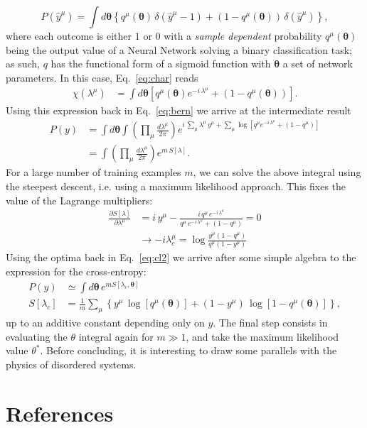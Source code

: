 \documentclass[5p]{elsarticle}
\begin{document}
%
\begin{equation} \label{eq:bern}
P(\hat{y}^{\mu} ) = \int d\boldsymbol{\theta} \left\{ q^{\mu}(\boldsymbol{\theta}) \, \delta(\hat{y}^{\mu}-1 ) + (1-q^{\mu}(\boldsymbol{\theta}) ) \, \delta(\hat{y}^{\mu}) \right\},
\end{equation}
%
where each outcome is either $1$ or $0$ with a {\it sample dependent} probability $q^{\mu}(\boldsymbol{\theta})$ being the output value of a Neural Network solving a binary classification task; as such, $q$ has the functional form of a sigmoid function with $\boldsymbol{\theta}$ a set of network parameters. In this case, Eq.~\eqref{eq:char} reads
\begin{align} \label{eq:char}
 \chi(\lambda^{\mu}) &=  \int  d\boldsymbol{\theta} \left[ q^{\mu}(\boldsymbol{\theta} ) e^{-i \, \lambda^{\mu} } +(1-q^{\mu}(\boldsymbol{\theta} )) \right].
 \end{align}
%
Using this expression back in Eq.~\eqref{eq:bern} we arrive at the intermediate result
%
 \begin{align} \label{eq:cl2}
 P(y) &= \int d\boldsymbol{\theta} \int  \left( \prod_{\mu}  \frac{d\lambda^{\mu}}{2\pi} \right) e^{i \, \sum_{\mu} \lambda^{\mu} \, y^{\mu} +\sum_{\mu} \log \left[ q^{\mu} e^{-i \, \lambda^{\mu} } +(1-q^{\mu}) \right] }  \\ \nonumber
 &=  \int  \left( \prod_{\mu}  \frac{d\lambda^{\mu}}{2\pi} \right) e^{m \, S[\lambda]}.
 \end{align}
%
For a large number of training examples $m$, we can solve the above integral using the steepest descent, i.e. using a maximum likelihood approach. This fixes the value of the Lagrange multipliers:
%
\begin{align} \label{eq:cl3}
\frac{\partial S[\lambda]}{\partial \lambda^{\mu}} &= i \, y^{\mu} - \frac{i \, q^{\mu} \, e^{-i \, \lambda^{\mu}}}{q^{\mu} \, e^{-i \, \lambda^{\mu}} + (1-q^{\mu})} = 0 \\ \nonumber
&\rightarrow - i \lambda^{\mu}_{c} =  \log \frac{y^{\mu}(1-q^{\mu}) }{q^{\mu}(1- y^{\mu})}
\end{align}
%
Using the optima back in Eq.~\eqref{eq:cl2} we arrive after some simple algebra to the expression for the cross-entropy:
%
\begin{align} \label{eq:cl3}
P(y) &\simeq \int d\boldsymbol{\theta} \, e^{m S[\lambda_c, \boldsymbol{\theta}]} \\ \nonumber
S[\lambda_c] &= \frac{1}{m} \sum_{\mu} \left\{ y^{\mu} \, \log [ q^{\mu}( \boldsymbol{\theta} ) ] + (1-y^{\mu}) \, \log [1-q^{\mu}( \boldsymbol{\theta}) ] \right\},
\end{align}
%
up to an additive constant depending only on $y$. The final step consists in evaluating the $\theta$ integral again for $m \gg 1$, and take the maximum likelihood value $\theta^*$. Before concluding, it is interesting to draw some parallels with the physics of disordered systems.



\section*{References}


\end{document}
